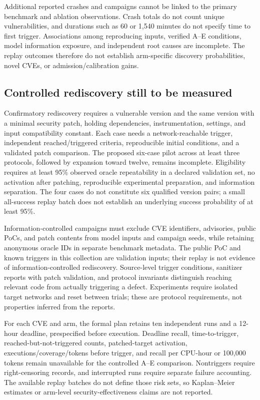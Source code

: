 \documentclass[final,5p,times,number]{elsarticle}
\begin{document}
Additional reported crashes and campaigns cannot be linked to the primary benchmark and ablation observations. Crash totals do not count unique vulnerabilities, and durations such as 60 or 1,540 minutes do not specify time to first trigger. Associations among reproducing inputs, verified A--E conditions, model information exposure, and independent root causes are incomplete. The replay outcomes therefore do not establish arm-specific discovery probabilities, novel CVEs, or admission/calibration gains.

\subsection{Controlled rediscovery still to be measured}
Confirmatory rediscovery requires a vulnerable version and the same version with a minimal security patch, holding dependencies, instrumentation, settings, and input compatibility constant. Each case needs a network-reachable trigger, independent reached/triggered criteria, reproducible initial conditions, and a validated patch comparison. The proposed six-case pilot across at least three protocols, followed by expansion toward twelve, remains incomplete. Eligibility requires at least 95\% observed oracle repeatability in a declared validation set, no activation after patching, reproducible experimental preparation, and information separation. The four cases do not constitute six qualified version pairs; a small all-success replay batch does not establish an underlying success probability of at least 95\%.

Information-controlled campaigns must exclude CVE identifiers, advisories, public PoCs, and patch contents from model inputs and campaign seeds, while retaining anonymous oracle IDs in separate benchmark metadata. The public PoC and known triggers in this collection are validation inputs; their replay is not evidence of information-controlled rediscovery. Source-level trigger conditions, sanitizer reports with patch validation, and protocol invariants distinguish reaching relevant code from actually triggering a defect. Experiments require isolated target networks and reset between trials; these are protocol requirements, not properties inferred from the reports.

For each CVE and arm, the formal plan retains ten independent runs and a 12-hour deadline, prespecified before execution. Deadline recall, time-to-trigger, reached-but-not-triggered counts, patched-target activation, executions/coverage/tokens before trigger, and recall per CPU-hour or 100,000 tokens remain unavailable for the controlled A--E comparison. Nontriggers require right-censoring records, and interrupted runs require separate failure accounting. The available replay batches do not define those risk sets, so Kaplan--Meier estimates or arm-level security-effectiveness claims are not reported.
\end{document}
